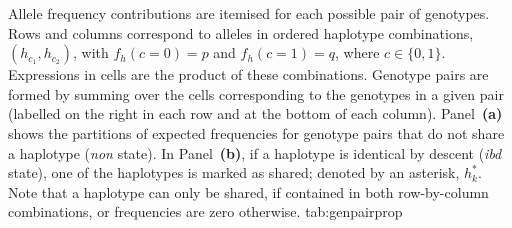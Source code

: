 

\begin{table}[!b]
{Allele frequency contributions are itemised for each possible pair of genotypes.
Rows and columns correspond to alleles in ordered haplotype combinations, ${(h_{c_{1}}, h_{c_{2}})}$, with ${f_h(c=0)=p}$ and ${f_h(c=1)=q}$, where ${c \in \lbrace 0,1 \rbrace}$.
Expressions in cells are the product of these combinations.
Genotype pairs are formed by summing over the cells corresponding to the  genotypes in a given pair (labelled on the right in each row and at the bottom of each column).
Panel~\textbf{(a)} shows the partitions of expected frequencies for genotype pairs that do not share a haplotype (\ie \emph{non} state).
In Panel~\textbf{(b)}, if a haplotype is identical by descent (\ie \emph{ibd} state), one of the haplotypes is marked as shared; denoted by an asterisk, $h^*_{k}$.
Note that a haplotype can only be shared, if contained in both row-by-column combinations, or frequencies are zero otherwise.}
{tab:genpairprop}


\end{table}
